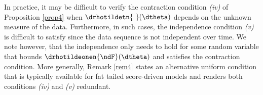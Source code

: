 






In practice, it may be difficult to verify the contraction condition  \textit{(iv)} of Proposition \ref{prop4} when $\drhotildetn{\ }(\dtheta)$ depends on the unknown measure of the data. Furthermore, in such cases,  the independence condition \emph{(v)} is difficult to satisfy since the data sequence is not independent over time. We note however, that the independence only needs to hold for some random variable that bounds $ \drhotildeonen{\ndF}(\dtheta)$ and satisfies the contraction condition. More generally, Remark \ref{rem4} states an alternative uniform condition that is typically available for fat tailed score-driven models and renders both conditions \textit{(iv)} and \textit{(v)}  redundant. 


